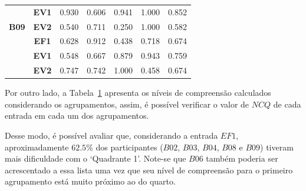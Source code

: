 \begin{table}[htbp]
\begin{tabular}{|ccccccc|}
		\rowcolor[HTML]{F2F2F2} 
		\multicolumn{1}{|c|}{\cellcolor[HTML]{F2F2F2}} & \multicolumn{1}{c|}{\cellcolor[HTML]{F2F2F2}\textbf{EV1}} & \multicolumn{1}{c|}{\cellcolor[HTML]{F2F2F2}0.930} & \multicolumn{1}{c|}{\cellcolor[HTML]{F2F2F2}0.606} & \multicolumn{1}{c|}{\cellcolor[HTML]{F2F2F2}0.941} & \multicolumn{1}{c|}{\cellcolor[HTML]{F2F2F2}1.000} & 0.852 \\ \cline{2-7} 
		\multicolumn{1}{|c|}{\multirow{-3}{*}{\cellcolor[HTML]{F2F2F2}\textbf{B09}}} & \multicolumn{1}{c|}{\textbf{EV2}} & \multicolumn{1}{c|}{0.540} & \multicolumn{1}{c|}{0.711} & \multicolumn{1}{c|}{0.250} & \multicolumn{1}{c|}{1.000} & 0.582 \\ \hline
		\rowcolor[HTML]{F2F2F2} 
		\multicolumn{1}{|c|}{\cellcolor[HTML]{F2F2F2}} & \multicolumn{1}{c|}{\cellcolor[HTML]{F2F2F2}\textbf{EF1}} & \multicolumn{1}{c|}{\cellcolor[HTML]{F2F2F2}0.628} & \multicolumn{1}{c|}{\cellcolor[HTML]{F2F2F2}0.912} & \multicolumn{1}{c|}{\cellcolor[HTML]{F2F2F2}0.438} & \multicolumn{1}{c|}{\cellcolor[HTML]{F2F2F2}0.718} & 0.674 \\ \cline{2-7} 
		\multicolumn{1}{|c|}{\cellcolor[HTML]{F2F2F2}} & \multicolumn{1}{c|}{\textbf{EV1}} & \multicolumn{1}{c|}{0.548} & \multicolumn{1}{c|}{0.667} & \multicolumn{1}{c|}{0.879} & \multicolumn{1}{c|}{0.943} & 0.759 \\ \cline{2-7} 
		\rowcolor[HTML]{F2F2F2} 
		\multicolumn{1}{|c|}{\multirow{-3}{*}{\cellcolor[HTML]{F2F2F2}\textbf{B10}}} & \multicolumn{1}{c|}{\cellcolor[HTML]{F2F2F2}\textbf{EV2}} & \multicolumn{1}{c|}{\cellcolor[HTML]{F2F2F2}0.747} & \multicolumn{1}{c|}{\cellcolor[HTML]{F2F2F2}0.742} & \multicolumn{1}{c|}{\cellcolor[HTML]{F2F2F2}1.000} & \multicolumn{1}{c|}{\cellcolor[HTML]{F2F2F2}0.458} & 0.674 \\ \hline
	\end{tabular}
	\label{tab:F3A1_NC_entradas_comagrupamento}
\end{table}

Por outro lado, a Tabela~\ref{tab:F3A1_NC_entradas_comagrupamento} apresenta os níveis de compreensão calculados considerando os agrupamentos, assim, é possível verificar o valor de $NCQ$ de cada entrada em cada um dos agrupamentos.

Desse modo, é possível avaliar que, considerando a entrada $EF1$, aproximadamente $62.5\%$ dos participantes ($B02$, $B03$, $B04$, $B08$ e $B09$) tiveram mais dificuldade com o `Quadrante 1'. Note-se que $B06$ também poderia ser acrescentado a essa lista uma vez que seu nível de compreensão para o primeiro agrupamento está muito próximo ao do quarto. 

